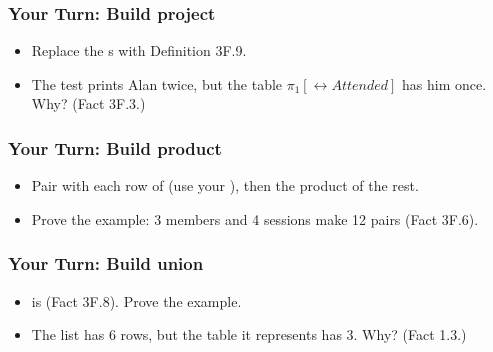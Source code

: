 \documentclass{ltx-talk}
\begin{document}
\begin{frame*}
  \frametitle{Your Turn: Build project}
  \begin{itemize}
    \item {} Replace the s with Definition 3F.9.
    \item {} The test prints Alan twice, but the table
      $\pi_1[\rel{Attended}]$ has him once. Why? (Fact 3F.3.)
  \end{itemize}
\end{frame*}

\begin{frame*}
  \frametitle{Your Turn: Build product}
  \begin{itemize}
    \item {} Pair  with each row of  (use your
      ), then \code{++} the product of the rest.
    \item {} Prove the example: 3 members and 4 sessions make 12
      pairs (Fact 3F.6).
  \end{itemize}
\end{frame*}

\begin{frame*}
  \frametitle{Your Turn: Build union}
  \begin{itemize}
    \item {}  is  (Fact 3F.8). Prove the
      example.
    \item {} The list has 6 rows, but the table it represents has
      3. Why? (Fact 1.3.)
  \end{itemize}
\end{frame*}
\end{document}
